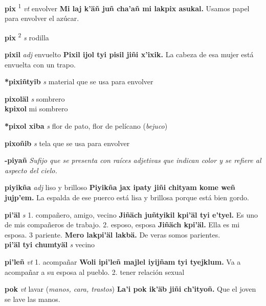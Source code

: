 \documentclass[10pt]{scrbook}
\newcommand{\entry}[1]{\textbf{#1}}
\newcommand{\onedefinition}[1]{#1.}
\newcommand{\defsuperscript}[1]{\textsuperscript{#1}}
\newcommand{\nontranslationdef}[1]{\textit{#1}}
\newcommand{\partofspeech}[1]{\textit{#1}}
\newcommand{\spanishtranslation}[1]{#1}
\newcommand{\clarification}[1]{(\textit{#1})}
\newcommand{\cholexample}[1]{\textbf{#1}}
\newcommand{\exampletranslation}[1]{#1}
\newcommand{\secondaryentry}[1]{\\\textbf{#1}}
\newcommand{\secondpartofspeech}[1]{\textit{#1}}
\newcommand{\secondtranslation}[1]{#1}
\begin{document}
\begin{multicols}{2}
\entry{pix}
\defsuperscript{1}
\partofspeech{vt}
\spanishtranslation{envolver}
\cholexample{Mi laj k'äñ juñ cha'añ mi lakpix asukal.}
\exampletranslation{Usamos papel para envolver el azúcar.}

\entry{pix}
\defsuperscript{2}
\partofspeech{s}
\spanishtranslation{rodilla}

\entry{pixil}
\partofspeech{adj}
\spanishtranslation{envuelto}
\cholexample{Pixil ijol tyi pisil jiñi x'ixik.}
\exampletranslation{La cabeza de esa mujer está envuelta con un trapo.}

\entry{*pixiñtyib}
\partofspeech{s}
\spanishtranslation{material que se usa para envolver}

\entry{pixoläl}
\partofspeech{s}
\spanishtranslation{sombrero}
\secondaryentry{kpixol}
\secondtranslation{mi sombrero}

\entry{*pixol xiba}
\partofspeech{s}
\spanishtranslation{flor de pato, flor de pelícano}
\clarification{bejuco}

\entry{pixoñib}
\partofspeech{s}
\spanishtranslation{tela que se usa para envolver}

\entry{-piyañ}
\nontranslationdef{Sufijo que se presenta con raíces adjetivas que indican color y se refiere al aspecto del cielo.}

\entry{piyikña}
\partofspeech{adj}
\spanishtranslation{liso y brilloso}
\cholexample{Piyikña jax ipaty jiñi chityam kome weñ jujp'em.}
\exampletranslation{La espalda de ese puerco está lisa y brillosa porque está bien gordo.}

\entry{pi'äl}
\partofspeech{s}
\onedefinition{1}
\spanishtranslation{compañero, amigo, vecino}
\cholexample{Jiñäch juñtyikil kpi'äl tyi e'tyel.}
\exampletranslation{Es uno de mis compañeros de trabajo.}
\onedefinition{2}
\spanishtranslation{esposo, esposa}
\cholexample{Jiñäch kpi'äl.}
\exampletranslation{Ella es mi esposa.}
\onedefinition{3 pariente}
\cholexample{Mero lakpi'äl lakbä.}
\exampletranslation{De veras somos parientes.}
\secondaryentry{pi'äl tyi chumtyäl}
\secondpartofspeech{s}
\secondtranslation{vecino}

\entry{pi'leñ}
\partofspeech{vt}
\onedefinition{1}
\spanishtranslation{acompañar}
\cholexample{Woli ipi'leñ majlel iyijñam tyi tyejklum.}
\exampletranslation{Va a acompañar a su esposa al pueblo.}
\onedefinition{2}
\spanishtranslation{tener relación sexual}

\entry{pok}
\partofspeech{vt}
\spanishtranslation{lavar}
\clarification{manos, cara, trastos}
\cholexample{La'i pok ik'äb jiñi ch'ityoñ.}
\exampletranslation{Que el joven se lave las manos.}


\end{multicols}
\end{document}
